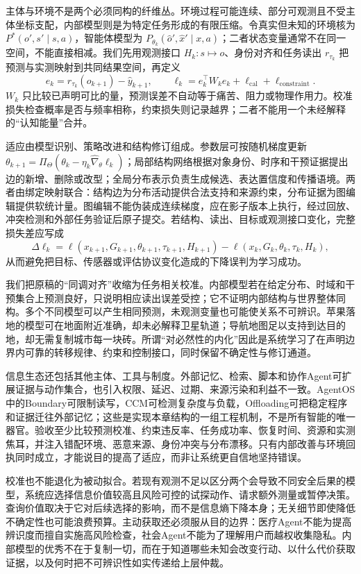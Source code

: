 主体与环境不是两个必须同构的纤维丛。环境过程可能连续、部分可观测且不受主体坐标支配，内部模型则是为特定任务形成的有限压缩。令真实但未知的环境核为 $P^*(o',s'\mid s,a)$，智能体模型为 $P_{\theta_k}(\hat{o}',\hat{x}'\mid x,a)$；二者状态变量通常不在同一空间，不能直接相减。我们先用观测接口 $H_k:s\mapsto o$、身份对齐和任务读出 $r_{\tau_k}$ 把预测与实测映射到共同结果空间，再定义
\[
e_k=r_{\tau_k}(o_{k+1})-\hat y_{k+1},\qquad
\ell_k=e_k^{\top}W_ke_k+\ell_{\mathrm{cal}}+\ell_{\mathrm{constraint}}.
\]
$W_k$ 只比较已声明可比的量，预测误差不自动等于痛苦、阻力或物理作用力。校准损失检查概率是否与频率相称，约束损失则记录越界；二者不能用一个未经解释的“认知能量”合并。

适应由模型识别、策略改进和结构修订组成。参数层可按随机梯度更新 $\theta_{k+1}=\Pi_\Theta(\theta_k-\eta_k\widehat\nabla_\theta\ell_k)$；局部结构网络根据对象身份、时序和干预证据提出边的新增、删除或改型；全局分布表示负责生成候选、表达置信度和传播语境。两者由绑定映射联合：结构边为分布活动提供合法支持和来源约束，分布证据为图编辑提供软统计量。图编辑不能伪装成连续梯度，应在影子版本上执行，经过回放、冲突检测和外部任务验证后原子提交。若结构、读出、目标或观测接口变化，完整损失差应写成
\[
\Delta\ell_k=\ell(x_{k+1},G_{k+1},\theta_{k+1},\tau_{k+1},H_{k+1})-
\ell(x_k,G_k,\theta_k,\tau_k,H_k),
\]
从而避免把目标、传感器或评估协议变化造成的下降误判为学习成功。

我们把原稿的“同调对齐”收缩为任务相关校准。内部模型若在给定分布、时域和干预集合上预测良好，只说明相应读出误差受控；它不证明内部结构与世界整体同构。多个不同模型可以产生相同预测，未观测变量也可能使关系不可辨识。苹果落地的模型可在地面附近准确，却未必解释卫星轨道；导航地图足以支持到达目的地，却无需复制城市每一块砖。所谓“对必然性的内化”因此是系统学习了在声明边界内可靠的转移规律、约束和控制接口，同时保留不确定性与修订通道。

信息生态还包括其他主体、工具与制度。外部记忆、检索、脚本和协作Agent可扩展证据与动作集合，也引入权限、延迟、过期、来源污染和利益不一致。AgentOS中的Boundary可限制读写，CCM可检测复杂度与负载，Offloading可把稳定程序和证据迁往外部记忆；这些是实现本章结构的一组工程机制，不是所有智能的唯一器官。验收至少比较预测校准、约束违反率、任务成功率、恢复时间、资源和实测焦耳，并注入错配环境、恶意来源、身份冲突与分布漂移。只有内部改善与环境回执同时成立，才能说目的提高了适应，而非让系统更自信地坚持错误。

校准也不能退化为被动拟合。若现有观测不足以区分两个会导致不同安全后果的模型，系统应选择信息价值较高且风险可控的试探动作、请求额外测量或暂停决策。查询价值取决于它对后续选择的影响，而不是信息熵下降本身；无关细节即使降低不确定性也可能浪费预算。主动获取还必须服从目的边界：医疗Agent不能为提高辨识度而擅自实施高风险检查，社会Agent不能为了理解用户而越权收集隐私。内部模型的优秀不在于复制一切，而在于知道哪些未知会改变行动、以什么代价获取证据，以及何时把不可辨识性如实传递给上层仲裁。

